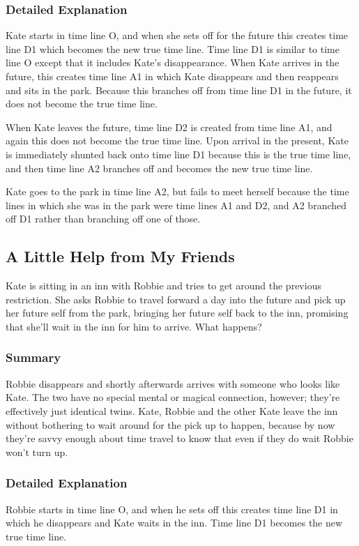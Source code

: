 \begin{multicols*}{2}
\subsubsection{Detailed Explanation}
Kate starts in time line O, and when she sets off for the future this creates time line D1 which becomes the new true time line. Time line D1 is similar to time line O except that it includes Kate’s disappearance. When Kate arrives in the future, this creates time line A1 in which Kate disappears and then reappears and sits in the park. Because this branches off from time line D1 in the future, it does not become the true time line.

When Kate leaves the future, time line D2 is created from time line A1, and again this does not become the true time line. Upon arrival in the present, Kate is immediately shunted back onto time line D1 because this is the true time line, and then time line A2 branches off and becomes the new true time line.

Kate goes to the park in time line A2, but fails to meet herself because the time lines in which she was in the park were time lines A1 and D2, and A2 branched off D1 rather than branching off one of those.

\subsection{A Little Help from My Friends}
Kate is sitting in an inn with Robbie and tries to get around the previous restriction. She asks Robbie to travel forward a day into the future and pick up her future self from the park, bringing her future self back to the inn, promising that she’ll wait in the inn for him to arrive. What happens?

\subsubsection{Summary}
Robbie disappears and shortly afterwards arrives with someone who looks like Kate. The two have no special mental or magical connection, however; they’re effectively just identical twins. Kate, Robbie and the other Kate leave the inn without bothering to wait around for the pick up to happen, because by now they’re savvy enough about time travel to know that even if they do wait Robbie won’t turn up.

\subsubsection{Detailed Explanation}
Robbie starts in time line O, and when he sets off this creates time line D1 in which he disappears and Kate waits in the inn. Time line D1 becomes the new true time line.


\end{multicols*}
